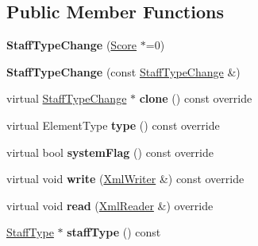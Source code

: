 \subsection*{Public Member Functions}
\begin{DoxyCompactItemize}
\item 
\mbox{\label{class_ms_1_1_staff_type_change_a7a1325cfa4af5b4b61c55fe3f59eb93f}} 
{\bfseries Staff\+Type\+Change} (\hyperlink{class_ms_1_1_score}{Score} $\ast$=0)
\item 
\mbox{\label{class_ms_1_1_staff_type_change_a14cfec214fcb80a8bd48b8fe90197606}} 
{\bfseries Staff\+Type\+Change} (const \hyperlink{class_ms_1_1_staff_type_change}{Staff\+Type\+Change} \&)
\item 
\mbox{\label{class_ms_1_1_staff_type_change_a7e2456ae7d4bf43c62a8130d4721f06a}} 
virtual \hyperlink{class_ms_1_1_staff_type_change}{Staff\+Type\+Change} $\ast$ {\bfseries clone} () const override
\item 
\mbox{\label{class_ms_1_1_staff_type_change_afd5e3f4e1ec7140d7d4e20c136f0922b}} 
virtual Element\+Type {\bfseries type} () const override
\item 
\mbox{\label{class_ms_1_1_staff_type_change_a49a8c25f7292c4b6ffd2f6632f4216a0}} 
virtual bool {\bfseries system\+Flag} () const override
\item 
\mbox{\label{class_ms_1_1_staff_type_change_ab95d09c119f1b5b07d073f5b91741b46}} 
virtual void {\bfseries write} (\hyperlink{class_ms_1_1_xml_writer}{Xml\+Writer} \&) const override
\item 
\mbox{\label{class_ms_1_1_staff_type_change_a63694748c6d834689479c1ced31de85d}} 
virtual void {\bfseries read} (\hyperlink{class_ms_1_1_xml_reader}{Xml\+Reader} \&) override
\item 
\mbox{\label{class_ms_1_1_staff_type_change_a2ea34bd1cf248447ce56b71b275835e7}} 
\hyperlink{class_ms_1_1_staff_type}{Staff\+Type} $\ast$ {\bfseries staff\+Type} () const

\end{DoxyCompactItemize}
